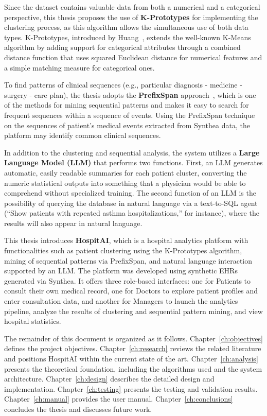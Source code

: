 Since the dataset contains valuable data from both a numerical and a categorical perspective, this thesis proposes the use of \textbf{K-Prototypes} for implementing the clustering process, as this algorithm allows the simultaneous use of both data types. K-Prototypes, introduced by Huang~\cite{huang1998}, extends the well-known K-Means algorithm by adding support for categorical attributes through a combined distance function that uses squared Euclidean distance for numerical features and a simple matching measure for categorical ones.

To find patterns of clinical sequences (e.g., particular diagnosis - medicine - surgery - care plan), the thesis adopts the \textbf{PrefixSpan} approach~\cite{pei2001}, which is one of the methods for mining sequential patterns and makes it easy to search for frequent sequences within a sequence of events. Using the PrefixSpan technique on the sequences of patient's medical events extracted from Synthea data, the platform may identify common clinical sequences.

In addition to the clustering and sequential analysis, the system utilizes a \textbf{Large Language Model (LLM)} that performs two functions. First, an LLM generates automatic, easily readable summaries for each patient cluster, converting the numeric statistical outputs into something that a physician would be able to comprehend without specialized training. The second function of an LLM is the possibility of querying the database in natural language via a text-to-SQL agent (``Show patients with repeated asthma hospitalizations,'' for instance), where the results will also appear in natural language.

This thesis introduces \textbf{HospitAI}, which is a hospital analytics platform with functionalities such as patient clustering using the K-Prototypes algorithm, mining of sequential patterns via PrefixSpan, and natural language interaction supported by an LLM. The platform was developed using synthetic EHRs generated via Synthea. It offers three role-based interfaces: one for Patients to consult their own medical record, one for Doctors to explore patient profiles and enter consultation data, and another for Managers to launch the analytics pipeline, analyze the results of clustering and sequential pattern mining, and view hospital statistics.

The remainder of this document is organized as it follows. Chapter~\ref{ch:objectives} defines the project objectives. Chapter~\ref{ch:research} reviews the related literature and positions HospitAI within the current state of the art. Chapter~\ref{ch:analysis} presents the theoretical foundation, including the algorithms used and the system architecture. Chapter~\ref{ch:design} describes the detailed design and implementation. Chapter~\ref{ch:testing} presents the testing and validation results. Chapter~\ref{ch:manual} provides the user manual. Chapter~\ref{ch:conclusions} concludes the thesis and discusses future work.